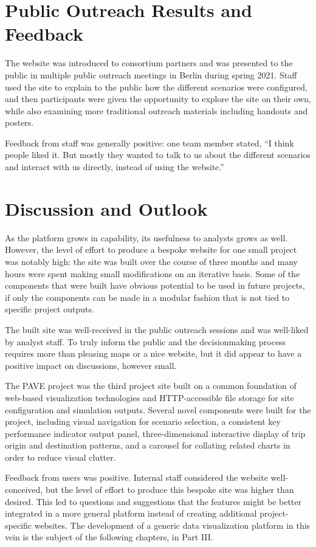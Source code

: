 \section{Public Outreach Results and Feedback}
\label{pave-feedback}

The website was introduced to consortium partners and was presented to the public in multiple public outreach meetings in Berlin during spring 2021. Staff used the site to explain to the public how the different scenarios were configured, and then participants were given the opportunity to explore the site on their own, while also examining more traditional outreach materials including handouts and posters.

Feedback from staff was generally positive: one team member stated, ``I think people liked it. But mostly they wanted to talk to us about the different scenarios and interact with us directly, instead of using the website.''

\section{Discussion and Outlook}
\label{pave-discussion}

As the platform grows in capability, its usefulness to analysts grows as well. However, the level of effort to produce a bespoke website for one small project was notably high: the site was built over the course of three months and many hours were spent making small modifications on an iterative basis. Some of the components that were built have obvious potential to be used in future projects, if only the components can be made in a modular fashion that is not tied to specific project outputs.

The built site was well-received in the public outreach sessions and was well-liked by analyst staff. To truly inform the public and the decisionmaking process requires more than pleasing maps or a nice website, but it did appear to have a positive impact on discussions, however small.

The PAVE project was the third project site built on a common foundation of web-based visualization technologies and HTTP-accessible file storage for site configuration and simulation outputs. Several novel components were built for the project, including visual navigation for scenario selection, a consistent key performance indicator output panel, three-dimensional interactive display of trip origin and destination patterns, and a carousel for collating related charts in order to reduce visual clutter.

Feedback from users was positive. Internal staff considered the website well-conceived, but the level of effort to produce this bespoke site was higher than desired. This led to questions and suggestions that the features might be better integrated in a more general platform instead of creating additional project-specific websites. The development of a generic data visualization platform in this vein is the subject of the following chapters, in Part III.
